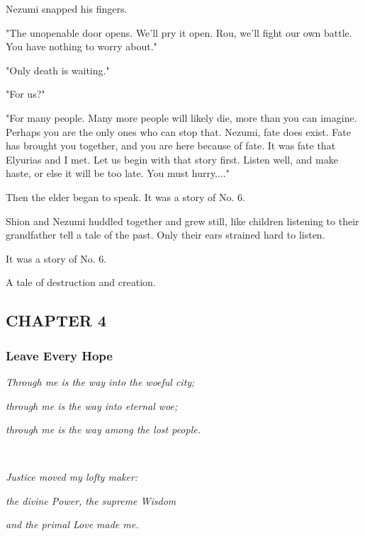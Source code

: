 Nezumi snapped his fingers.

"The unopenable door opens. We'll pry it open. Rou, we'll fight our own
battle. You have nothing to worry about."

"Only death is waiting."

"For us?"

"For many people. Many more people will likely die, more than you can
imagine. Perhaps you are the only ones who can stop that. Nezumi, fate
does exist. Fate has brought you together, and you are here because of
fate. It was fate that Elyurias and I met. Let us begin with that story
first. Listen well, and make haste, or else it will be too late. You
must hurry...."

Then the elder began to speak. It was a story of No. 6.

Shion and Nezumi huddled together and grew still, like children
listening to their grandfather tell a tale of the past. Only their ears
strained hard to listen.

It was a story of No. 6.

A tale of destruction and creation.

\hypertarget{index_split_053.htmlux5cux23calibre_pb_80}{}

\protect\hypertarget{index_split_078.html}{}{}

\hypertarget{index_split_078.htmlux5cux23calibre_pb_0}{}

\hypertarget{index_split_078.htmlux5cux23calibre_toc_5}{%
\subsection{CHAPTER 4}\label{index_split_078.htmlux5cux23calibre_toc_5}}

\subsubsection{Leave Every Hope}

\emph{Through me is the way into the woeful city;}

\emph{through me is the way into eternal woe;}

\emph{through me is the way among the lost people.}

\emph{\\
}

\emph{Justice moved my lofty maker:}

\emph{the divine Power, the supreme Wisdom}

\emph{and the primal Love made me.}

